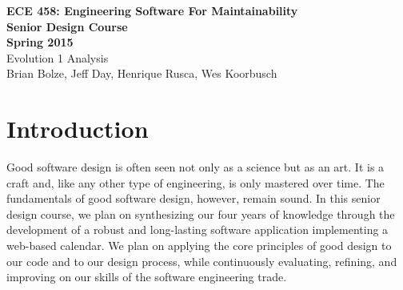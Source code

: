 \documentclass[11pt]{article}
\begin{document}
\begin{center}
\textbf{ECE 458: Engineering Software For Maintainability \\
Senior Design Course\\
Spring 2015\\[0.2in]}
Evolution 1 Analysis\\
Brian Bolze, Jeff Day, Henrique Rusca, Wes Koorbusch
\end{center}

\singlespacing
\tableofcontents





\pagebreak

\section{Introduction}

Good software design is often seen not only as a science but as an art. It is a craft and, like any other type of engineering, is only mastered over time. The fundamentals of good software design, however, remain sound. In this senior design course, we plan on synthesizing our four years of knowledge through the development of a robust and long-lasting software application implementing a web-based calendar. We plan on applying the core principles of good design to our code and to our design process, while continuously evaluating, refining, and improving on our skills of the software engineering trade. 
\end{document}
